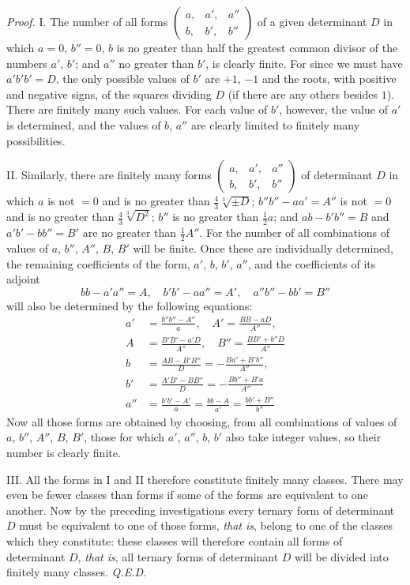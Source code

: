 \emph{Proof.} I. The number of all forms \(\left(\begin{smallmatrix}a,&a',&a''\\b,&b',&b''\end{smallmatrix}\right)\) of a given determinant \(D\) in which \(a=0\), \(b''=0\), \(b\) is no greater than half the greatest common divisor of the numbers \(a'\), \(b'\); and \(a''\) no greater than \(b'\), is clearly finite. For since we must have \(a'b'b'=D\), the only possible values of \(b'\) are \(+1\), \(-1\) and the roots, with positive and negative signs, of the squares dividing \(D\) (if there are any others besides \(1\)). There are finitely many such values. For each value of \(b'\), however, the value of \(a'\) is determined, and the values of \(b\), \(a''\) are clearly limited to finitely many possibilities.

II. Similarly, there are finitely many forms \(\left(\begin{smallmatrix}a,&a',&a''\\b,&b',&b''\end{smallmatrix}\right)\) of determinant \(D\) in which \(a\) is not \(=0\) and is no greater than \(\frac{4}{3}\sqrt[3]{\pm D}\); \(b''b''-aa'=A''\) is not \(=0\) and is no greater than \(\frac{4}{3}\sqrt[3]{D^2}\); \(b''\) is no greater than \(\frac{1}{2}a\); and \(ab-b'b''=B\) and \(a'b'-bb''=B'\) are no greater than \(\frac{1}{2}A''\). For the number of all combinations of values of \(a\), \(b''\), \(A''\), \(B\), \(B'\) will be finite. Once these are individually determined, the remaining coefficients of the form, \(a'\), \(b\), \(b'\), \(a''\), and the coefficients of its adjoint
\[
bb-a'a''=A,\quad b'b'-aa''=A',\quad a''b''-bb'=B''
\]
will also be determined by the following equations:
\[
\begin{aligned}
a'&=\frac{b''b''-A''}{a},\quad A'=\frac{BB-aD}{A''},\\
A&=\frac{B'B'-a'D}{A''},\quad B''=\frac{BB'+b''D}{A''}\\
b&=\frac{AB-B'B''}{D}=-\frac{Ba'+B'b''}{A''},\\
b'&=\frac{A'B'-BB''}{D}=-\frac{Bb''+B'a}{A''}\\
a''&=\frac{b'b'-A'}{a}=\frac{bb-A}{a'}=\frac{bb'+B''}{b''}
\end{aligned}
\]
Now all those forms are obtained by choosing, from all combinations of values of \(a\), \(b''\), \(A''\), \(B\), \(B'\), those for which \(a'\), \(a''\), \(b\), \(b'\) also take integer values, so their number is clearly finite.

III. All the forms in I and II therefore constitute finitely many classes. There may even be fewer classes than forms if some of the forms are equivalent to one another. Now by the preceding investigations every ternary form of determinant \(D\) must be equivalent to one of those forms, \emph{that is}, belong to one of the classes which they constitute: these classes will therefore contain all forms of determinant \(D\), \emph{that is}, all ternary forms of determinant \(D\) will be divided into finitely many classes. \emph{Q.E.D.}

